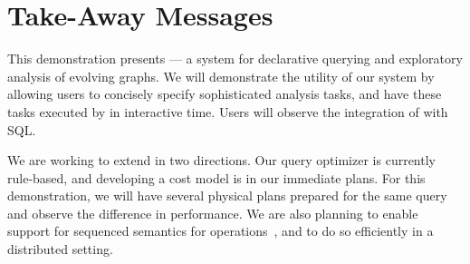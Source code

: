 \section{Take-Away Messages}
\label{sec:conc}

This demonstration presents \sys --- a system for declarative querying
and exploratory analysis of evolving graphs.  We will demonstrate the
utility of our system by allowing users to concisely specify
sophisticated analysis tasks, and have these tasks executed by \sys in
interactive time.  Users will observe the integration of \ql with SQL.

We are working to extend \sys in two directions.  Our query optimizer
is currently rule-based, and developing a cost model is in our
immediate plans.  For this demonstration, we will have several
physical plans prepared for the same query and observe the difference
in performance.  We are also planning to enable support for sequenced
semantics for \tga operations~\cite{MoffittEDBT17}, and to do so
efficiently in a distributed setting.

